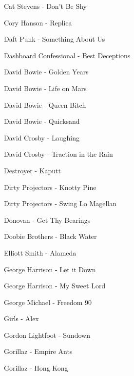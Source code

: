 Cat Stevens - Don't Be Shy \dotfill \pageref{Don't Be Shy - Cat Stevens} 

Cory Hanson - Replica \dotfill \pageref{Replica - Cory Hanson} 

Daft Punk - Something About Us \dotfill \pageref{Something About Us - Daft Punk} 

Dashboard Confessional - Best Deceptions \dotfill \pageref{Best Deceptions - Dashboard Confessional} 

David Bowie - Golden Years \dotfill \pageref{Golden Years - David Bowie} 

David Bowie - Life on Mars \dotfill \pageref{Life on Mars - David Bowie} 

David Bowie - Queen Bitch \dotfill \pageref{Queen Bitch - David Bowie} 

David Bowie - Quicksand \dotfill \pageref{Quicksand - David Bowie} 

David Crosby - Laughing \dotfill \pageref{Laughing - David Crosby} 

David Crosby - Traction in the Rain \dotfill \pageref{Traction in the Rain - David Crosby} 

Destroyer - Kaputt \dotfill \pageref{Kaputt - Destroyer} 

Dirty Projectors - Knotty Pine \dotfill \pageref{Knotty Pine - Dirty Projectors} 

Dirty Projectors - Swing Lo Magellan \dotfill \pageref{Swing Lo Magellan - Dirty Projectors} 

Donovan - Get Thy Bearings \dotfill \pageref{Get Thy Bearings - Donovan} 

Doobie Brothers - Black Water \dotfill \pageref{Black Water - Doobie Brothers} 

Elliott Smith - Alameda \dotfill \pageref{Alameda - Elliott Smith} 

George Harrison - Let it Down \dotfill \pageref{Let it Down - George Harrison} 

George Harrison - My Sweet Lord \dotfill \pageref{My Sweet Lord - George Harrison} 

George Michael - Freedom 90 \dotfill \pageref{Freedom 90 - George Michael} 

Girls - Alex \dotfill \pageref{Alex - Girls} 

Gordon Lightfoot - Sundown \dotfill \pageref{Sundown - Gordon Lightfoot} 

Gorillaz - Empire Ants \dotfill \pageref{Empire Ants - Gorillaz} 

Gorillaz - Hong Kong \dotfill \pageref{Hong Kong - Gorillaz} 

